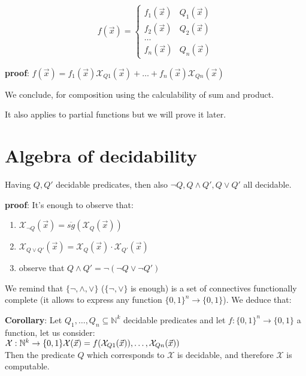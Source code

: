 \documentclass{amsbook}
\newcommand{\nat}{\ensuremath{\mathbb{N}}}
\theoremstyle{definition}
\theoremstyle{remark}
\numberwithin{section}{chapter}
\numberwithin{equation}{chapter}
\begin{document}
\begin{equation*}
	f(\vec{x}) = \begin{cases}
		f_1(\vec{x}) & Q_1(\vec{x}) \\
		f_2(\vec{x}) & Q_2(\vec{x}) \\
		\dots        &              \\
		f_n(\vec{x}) & Q_n(\vec{x})
	\end{cases}
\end{equation*}

\textbf{proof}:
$f(\vec{x}) = f_1(\vec{x})\mathcal{X}_{Q1}(\vec{x}) + \dots + f_n(\vec{x})\mathcal{X}_{Qn}(\vec{x})$

We conclude, for composition using the calculability of sum and product.

It also applies to partial functions but we will prove it later.

\section{Algebra of decidability}
Having $ Q, Q' $   decidable predicates, then also $ \neg Q, Q \wedge Q', Q \vee Q' $ all decidable.

\textbf{proof}:
It's enough to observe that:
\begin{enumerate}
	\item $ \mathcal{X}_{\lnot Q}(\vec{x}) =  \overline{sg}(\mathcal{X}_Q(\vec{x})) $
	\item $\mathcal{X}_{Q \vee Q'}(\vec{x}) = \mathcal{X}_{Q}(\vec{x}) \cdot \mathcal{X}_{Q'}(\vec{x})$
	\item observe that $Q \wedge Q' = \lnot (\lnot Q \vee \lnot Q')$
\end{enumerate}

We remind that $\{\neg, \wedge, \vee \}$ ($\{\neg, \vee \}$ is enough) is a set of connectives functionally complete (it allows to express any function $\{0,1\}^n \rightarrow \{0,1\}$). We deduce that:

\textbf{Corollary}: Let $Q_1, \dots, Q_n \subseteq \nat^k$ decidable predicates and let $f:\{0,1\}^n \rightarrow \{0,1\}$ a function, let us consider:\\
$\mathcal{X}: \nat^k\rightarrow\{0,1\}\\
	\mathcal{X}(\vec{x}) = f(\mathcal{X}_{Q1}(\vec{x})), \dots, \mathcal{X}_{Qn}(\vec{x}) )$\\
Then the predicate $Q$ which corresponds to $\mathcal{X}$ is decidable, and therefore $\mathcal{X}$ is computable.
\end{document}

